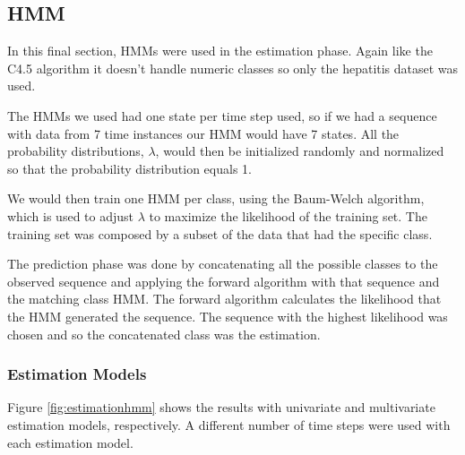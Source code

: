 \subsection{HMM}
\label{subsection:hmm}

In this final section, HMMs were used in the estimation phase. Again like the C4.5 algorithm it doesn't handle
numeric classes so only the hepatitis dataset was used.

The HMMs we used had one state per time step used, so if we had a sequence with data from 7 time instances our HMM 
would have 7 states. All the probability distributions, $\lambda$, would then be initialized randomly and normalized 
so that the probability distribution equals 1.

We would then train one HMM per class, using the Baum-Welch algorithm, which is used to adjust $\lambda$ to maximize the 
likelihood of the training set. The training set was composed by a subset of the data that had the specific class. 

The prediction phase was done by concatenating all the possible classes to the observed sequence and applying the forward
 algorithm with that sequence and the matching class HMM. The forward algorithm calculates the likelihood that the HMM 
 generated the sequence. The sequence with the highest likelihood was chosen and so the concatenated class was the estimation.

\subsubsection{Estimation Models}
\label{subsubsection:estimation_hmm}

Figure \ref{fig:estimationhmm} shows the results with univariate and multivariate estimation models,
 respectively. A different number of time steps were used with each estimation model.
 
